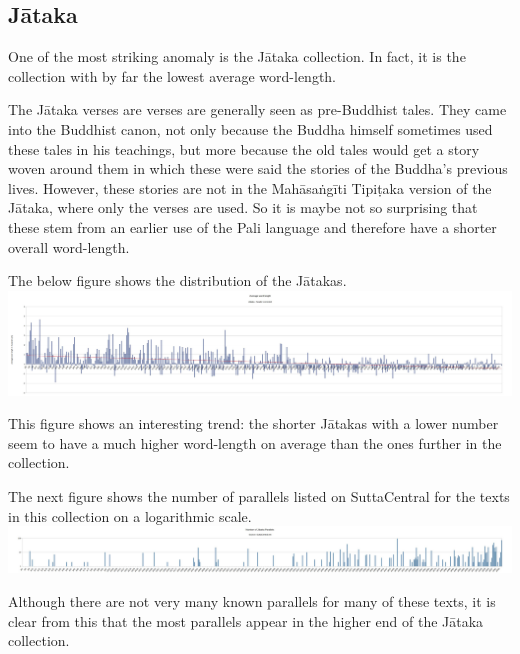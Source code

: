 \subsection{Jātaka}
One of the most striking anomaly is the Jātaka collection. In fact, it is the collection with by far the lowest average word-length.

The Jātaka verses are verses are generally seen as pre-Buddhist tales. They came into the Buddhist canon, not only because the Buddha himself sometimes used these tales in his teachings, but more because the old tales would get a story woven around them in which these were said the stories of the Buddha's previous lives. However, these stories are not in the Mahāsaṅgīti Tipiṭaka version of the Jātaka, where only the verses are used. So it is maybe not so surprising that these stem from an earlier use of the Pali language and therefore have a shorter overall word-length.

The below figure shows the distribution of the Jātakas.\\

\includegraphics[width=\linewidth]{jataka.jpg}
\label{jataka}

\medskip
This figure shows an interesting trend: the shorter Jātakas with a lower number seem to have a much higher word-length on average than the ones further in the collection. 

The next figure shows the number of parallels listed on SuttaCentral for the texts in this collection on a logarithmic scale. \\

\includegraphics[width=\linewidth]{jatakapars.jpg}
\label{jatakapars}

\medskip
Although there are not very many known parallels for many of these texts, it is clear from this that the most parallels appear in the higher end of the Jātaka collection.

